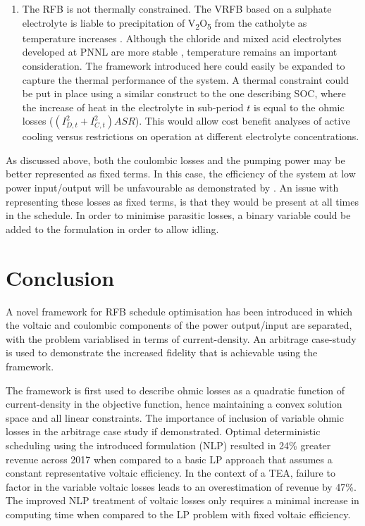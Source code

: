 \documentclass[preprint,3p,review,authoryear,10pt]{elsarticle}
\begin{document}
\begin{enumerate}
    \item The RFB is not thermally constrained. The VRFB based on a sulphate electrolyte is liable to precipitation of  V\textsubscript{2}O\textsubscript{5} from the catholyte as temperature increases \citep{Rahman2009,Vijayakumar2011}. Although the chloride and mixed acid electrolytes developed at PNNL are more stable \citep{Li2011,Kim2011}, temperature remains an important consideration. The framework introduced here could easily be expanded to capture the thermal performance of the system. A thermal constraint could be put in place using a similar construct to the one describing SOC, where the increase of heat in the electrolyte in sub-period $t$ is equal to the ohmic losses ($(I_{D,t}^{2} + I_{C,t}^{2})ASR$). This would allow cost benefit analyses of active cooling versus restrictions on operation at different electrolyte concentrations.

    
\end{enumerate}

As discussed above, both the coulombic losses and the pumping power may be better represented as fixed terms. In this case, the efficiency of the system at low power input/output will be unfavourable as demonstrated by \cite{Nguyen2014}. An issue with representing these losses as fixed terms, is that they would be present at all times in the schedule. In order to minimise parasitic losses, a binary variable could be added to the formulation in order to allow idling.

\section{Conclusion} 
\label{sec:Conclusion}
A novel framework for RFB schedule optimisation has been introduced in which the voltaic and coulombic components of the power output/input are separated, with the problem variablised in terms of current-density. An arbitrage case-study is used to demonstrate the increased fidelity that is achievable using the framework.

The framework is first used to describe ohmic losses as a quadratic function of current-density in the objective function, hence maintaining a convex solution space and all linear constraints. The importance of inclusion of variable ohmic losses in the arbitrage case study if demonstrated. Optimal deterministic scheduling using the introduced formulation (NLP) resulted in 24\% greater revenue across 2017 when compared to a basic LP approach that assumes a constant representative voltaic efficiency. In the context of a TEA, failure to factor in the variable voltaic losses leads to an overestimation of revenue by 47\%. The improved NLP treatment of voltaic losses only requires a minimal increase in computing time when compared to the LP problem with fixed voltaic efficiency. 
\end{document}
